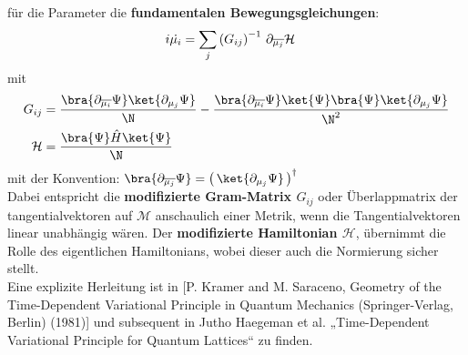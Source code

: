 für die Parameter die \textbf{fundamentalen Bewegungsgleichungen}:
\begin{align}\label{Bewegungsgleichung}
    i\dot{\mu_i} &= \sum_{j}\left(G_{ij}\right)^{-1}\thinspace \partial_{\overline{\mu_j}}\mathcal{H}
\end{align}
mit 
\begin{align}
    G_{ij} &= \frac{\bra{\partial_{\overline{\mu_i}}\Psi}\ket{\partial_{\mu_j}\Psi}}{\N} 
    - \frac{\bra{\partial_{\overline{\mu_i}}\Psi}\ket{\Psi}\bra{\Psi}\ket{\partial_{\mu_j}\Psi}}{\N^2} \\
    \mathcal{H} &= \frac{\bra{\Psi}\hat{H}\ket{\Psi}}{\N}
\end{align}
\noindent mit der Konvention: $\bra{\partial_{\overline{\mu_j}}\Psi} = \left(\thinspace\ket{\partial_{\mu_j}\Psi}\thinspace\right)^\dagger$\\
\noindent Dabei entspricht die \textbf{modifizierte Gram-Matrix $G_{ij}$} oder Überlappmatrix der tangentialvektoren auf $\mathcal{M}$ anschaulich einer
Metrik, wenn die Tangentialvektoren linear unabhängig wären. Der \textbf{modifizierte Hamiltonian $\mathcal{H}$}, übernimmt die Rolle des eigentlichen 
Hamiltonians, wobei dieser auch die Normierung sicher stellt. \\
Eine explizite Herleitung ist in [P. Kramer and M. Saraceno, Geometry of the Time-Dependent Variational Principle in Quantum Mechanics
(Springer-Verlag, Berlin) (1981)]\cite{noauthor_2008-dn} und subsequent in Jutho Haegeman et al. „Time-Dependent Variational Principle for Quantum Lattices“\cite{Haegeman_2011} zu finden.

\newpage












